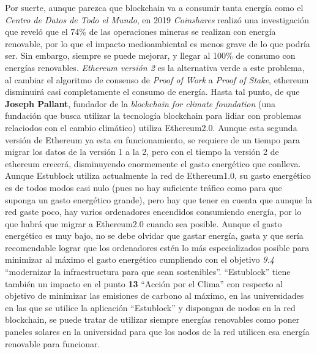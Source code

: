 Por suerte, aunque parezca que blockchain va a consumir tanta energía como el \textit{Centro de Datos de Todo el Mundo}, en 2019 \emph{Coinshares} realizó una investigación\cite{coinshare} que reveló que el 74\% de las operaciones mineras se realizan con energía renovable, por lo que el impacto medioambiental es menos grave de lo que podría ser. Sin embargo, siempre se puede mejorar, y llegar al 100\% de consumo con energías renovables. \emph{Ethereum versión 2}\cite{Ethereum2.0} es la alternativa verde a este problema, al cambiar el algoritmo de consenso de \textit{Proof of Work} a \textit{Proof of Stake}, ethereum disminuirá casi completamente el consumo de energía. Hasta tal punto, de que \textbf{Joseph Pallant}, fundador de la \emph{blockchain for climate foundation}\cite{bkClimateF} (una fundación que busca utilizar la tecnología blockchain para lidiar con problemas relaciodos con el cambio climático) utiliza Ethereum2.0. Aunque esta segunda versión de Ethereum ya esta en funcionamiento, se requiere de un tiempo para migrar los datos de la versión 1 a la 2, pero con el tiempo la versión 2 de ethereum crecerá, disminuyendo enormemente el gasto energético que conlleva. \\

Aunque Estublock utiliza actualmente la red de Ethereum1.0, su gasto energético es de todos modos casi nulo (pues no hay suficiente tráfico como para que suponga un gasto energético grande), pero hay que tener en cuenta que aunque la red gaste poco, hay varios ordenadores encendidos consumiendo energía, por lo que habrá que migrar a Ethereum2.0 cuando sea posible. Aunque el gasto energético es muy bajo, no se debe olvidar que gastar energía, gasta y que sería recomendable lograr que los ordenadores estén lo más especializados posible para minimizar al máximo el gasto energético cumpliendo con el objetivo \textit{9.4} ``modernizar la infraestructura para que sean sostenibles''. ``Estublock'' tiene también un impacto en el punto \textbf{13} ``Acción por el Clima'' con respecto al objetivo de minimizar las emisiones de carbono al máximo, en las universidades en las que se utilice la aplicación ``Estublock'' y dispongan de nodos en la red blockchain, se puede tratar de utilizar siempre energías renovables como poner paneles solares en la universidad para que los nodos de la red utilicen esa energía renovable para funcionar.

